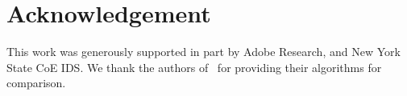 \documentclass[letterpaper]{article}
\begin{document}


\section*{Acknowledgement}
This work was generously supported in part by Adobe Research, and New York State CoE IDS. We thank the authors of~\cite{Zhao:2014:EPF:2647868.2654930} for providing their algorithms for comparison.



\end{document}
